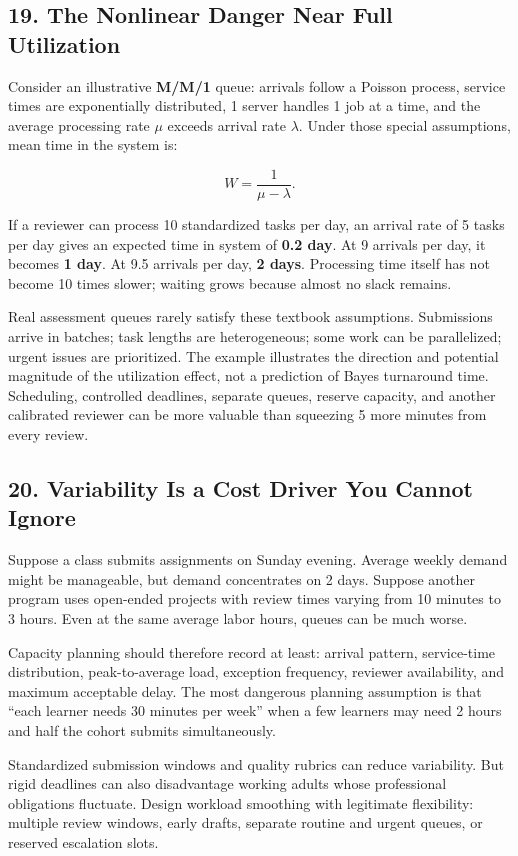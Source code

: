 \subsection*{19. The Nonlinear Danger Near Full Utilization}

Consider an illustrative \textbf{M/M/1} queue: arrivals follow a Poisson process, service times are exponentially distributed, 1 server handles 1 job at a time, and the average processing rate $\mu$ exceeds arrival rate $\lambda$. Under those special assumptions, mean time in the system is:

\begin{equation}
W = \frac{1}{\mu - \lambda}.
\end{equation}

If a reviewer can process 10 standardized tasks per day, an arrival rate of 5 tasks per day gives an expected time in system of \textbf{0.2 day}. At 9 arrivals per day, it becomes \textbf{1 day}. At 9.5 arrivals per day, \textbf{2 days}. Processing time itself has not become 10 times slower; waiting grows because almost no slack remains.

Real assessment queues rarely satisfy these textbook assumptions. Submissions arrive in batches; task lengths are heterogeneous; some work can be parallelized; urgent issues are prioritized. The example illustrates the direction and potential magnitude of the utilization effect, not a prediction of Bayes turnaround time. Scheduling, controlled deadlines, separate queues, reserve capacity, and another calibrated reviewer can be more valuable than squeezing 5 more minutes from every review.

\subsection*{20. Variability Is a Cost Driver You Cannot Ignore}

Suppose a class submits assignments on Sunday evening. Average weekly demand might be manageable, but demand concentrates on 2 days. Suppose another program uses open-ended projects with review times varying from 10 minutes to 3 hours. Even at the same average labor hours, queues can be much worse.

Capacity planning should therefore record at least: arrival pattern, service-time distribution, peak-to-average load, exception frequency, reviewer availability, and maximum acceptable delay. The most dangerous planning assumption is that ``each learner needs 30 minutes per week'' when a few learners may need 2 hours and half the cohort submits simultaneously.

Standardized submission windows and quality rubrics can reduce variability. But rigid deadlines can also disadvantage working adults whose professional obligations fluctuate. Design workload smoothing with legitimate flexibility: multiple review windows, early drafts, separate routine and urgent queues, or reserved escalation slots.
